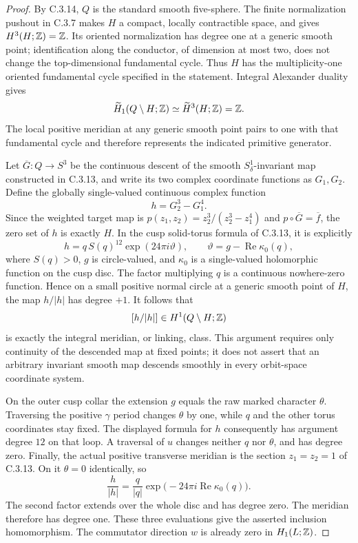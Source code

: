 \begin{proof}
By C.3.14, $Q$ is the standard smooth five-sphere. The finite
normalization pushout in C.3.7 makes $H$ a compact, locally
contractible space, and gives $H^3(H;\mathbb Z)=\mathbb Z$. Its oriented
normalization has degree one at a generic smooth point; identification
along the conductor, of dimension at most two, does not change the
top-dimensional fundamental cycle. Thus $H$ has the multiplicity-one
oriented fundamental cycle specified in the statement. Integral
Alexander duality gives
\[
 \widetilde H_1(Q\setminus H;\mathbb Z)
 \simeq \widetilde H^3(H;\mathbb Z)=\mathbb Z.
\]
The local positive meridian at any generic smooth point pairs to one
with that fundamental cycle and therefore represents the indicated
primitive generator.

Let $\overline G:Q\to S^3$ be the continuous descent of the smooth
$S^1_\delta$-invariant map constructed in C.3.13, and write its two
complex coordinate functions as $G_1,G_2$. Define the globally
single-valued continuous complex function
\[
 h=G_2^3-G_1^4.
\]
Since the weighted target map is
$p(z_1,z_2)=z_2^3/(z_2^3-z_1^4)$ and
$p\circ\overline G=\overline f$, the zero set of $h$ is exactly $H$.
In the cusp solid-torus formula of C.3.13, it is explicitly
\[
 h=q\,S(q)^{12}\exp(24\pi i\vartheta),\qquad
 \vartheta=g-\operatorname{Re}\kappa_0(q),
\]
where $S(q)>0$, $g$ is circle-valued, and $\kappa_0$ is a
single-valued holomorphic function on the cusp disc. The factor
multiplying $q$ is a continuous nowhere-zero function. Hence on a
small positive normal circle at a generic smooth point of $H$, the
map $h/|h|$ has degree $+1$. It follows that
\[
 [h/|h|]\in H^1(Q\setminus H;\mathbb Z)
\]
is exactly the integral meridian, or linking, class. This argument
requires only continuity of the descended map at fixed points; it
does not assert that an arbitrary invariant smooth map descends
smoothly in every orbit-space coordinate system.

On the outer cusp collar the extension $g$ equals the raw marked
character $\theta$. Traversing the positive $\gamma$ period changes
$\theta$ by one, while $q$ and the other torus coordinates stay fixed.
The displayed formula for $h$ consequently has argument degree
$12$ on that loop. A traversal of $u$ changes neither $q$ nor
$\theta$, and has degree zero. Finally, the actual positive
transverse meridian is the section $z_1=z_2=1$ of C.3.13. On it
$\theta=0$ identically, so
\[
 \frac{h}{|h|}
 =\frac{q}{|q|}\exp\bigl(-24\pi i\operatorname{Re}\kappa_0(q)\bigr).
\]
The second factor extends over the whole disc and has degree zero.
The meridian therefore has degree one. These three evaluations give
the asserted inclusion homomorphism. The commutator direction $w$
is already zero in $H_1(L;\mathbb Z)$.
\end{proof}

